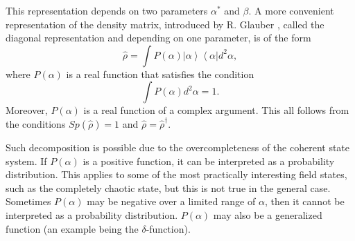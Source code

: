 This representation depends on two parameters $\alpha^{*}$ and $\beta$.
A more convenient representation of the density matrix, introduced by R. Glauber \cite{bQuantumOpticsAndRadioPhisicsLecture1966}, called the diagonal representation and depending on one parameter, is of the form  
\begin{equation}
\hat{\rho} = \int
P\left(\alpha\right)\left|\alpha\right>\left<\alpha\right| d^2 \alpha,
\label{eqCh1_rhorepresent}
\end{equation}
where $P\left(\alpha\right)$ is a real function that satisfies the condition 
\[
\int
P\left(\alpha\right) d^2 \alpha = 1.
\]
Moreover, $P\left(\alpha\right)$ is a real function of a complex argument. This all follows from the conditions $Sp\left(\hat{\rho}\right) = 1$ and $\hat{\rho} = \hat{\rho}^{\dag}$.
  
Such decomposition is possible due to the overcompleteness of the coherent state system. If $P\left(\alpha\right)$ is a positive function, it can be interpreted as a probability distribution. This applies to some of the most practically interesting field states, such as the completely chaotic state, but this is not true in the general case. Sometimes $P\left(\alpha\right)$ may be negative over a limited range of $\alpha$, then it cannot be interpreted as a probability distribution. $P\left(\alpha\right)$ may also be a generalized function (an example being the $\delta$-function). 


